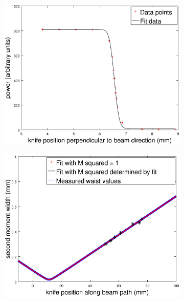 \begin{figure}
\centering
\begin{subfigure}[b]{0.47\textwidth}
\includegraphics[width=1\textwidth]{waistFitExample.eps}
\label{waistFitExample}
\end{subfigure}
\begin{subfigure}[b]{0.47\textwidth}
\includegraphics[width=1\textwidth]{waistExample.eps} 
\label{waistExample}
\end{subfigure}
\caption[Waist determination using a knife]{\label{waistGraphs} 
}
\end{figure}
